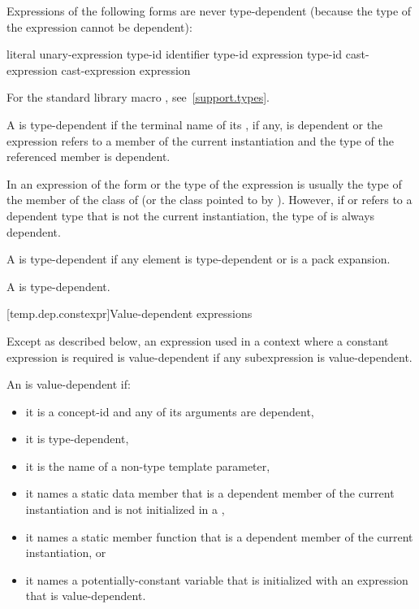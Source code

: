 \pnum
Expressions of the following forms are never type-dependent (because the type
of the expression cannot be dependent):
\begin{ncsimplebnf}
literal\br
{} unary-expression\br
{} \terminal{(} type-id \terminal{)}\br
{}  \terminal{(} identifier \terminal{)}\br
{} \terminal{(} type-id \terminal{)}\br
{} \terminal{(} expression \terminal{)}\br
{} \terminal{(} type-id \terminal{)}\br
\opt{\terminal{::}}  cast-expression\br
\opt{\terminal{::}}  \terminal{[} \terminal{]} cast-expression\br
{} \br
{} \terminal{(} expression \terminal{)}
\end{ncsimplebnf}

\begin{note}
For the standard library macro ,
see~\ref{support.types}.
\end{note}

\pnum
A  is
type-dependent if
the terminal name of its , if any, is dependent or
the expression refers to a member of the current instantiation and
the type of the referenced member is dependent.
\begin{note}
In an expression of the form
or
the type of the expression is usually the type of the member
of the class of
(or the class pointed to by
).
However, if
or
refers to a dependent type that is not the current instantiation,
the type of
is always dependent.
\end{note}

\pnum
A  is type-dependent if any element is
type-dependent or is a pack expansion.

\pnum
A  is type-dependent.

[temp.dep.constexpr]{Value-dependent expressions}

\pnum
Except as described below, an expression used in a context where a
constant expression is required is value-dependent if any
subexpression is value-dependent.

\pnum
An
is value-dependent if:
\begin{itemize}
\item
it is a concept-id and any of its arguments are dependent,
\item
it is type-dependent,
\item
it is the name of a non-type template parameter,
\item
it names a static data member that is a dependent member of the current
instantiation and is not initialized in a ,
\item
it names a static member function that is a dependent member of the current
instantiation, or
\item
it names a potentially-constant variable
that is initialized with an expression that is value-dependent.
\end{itemize}

